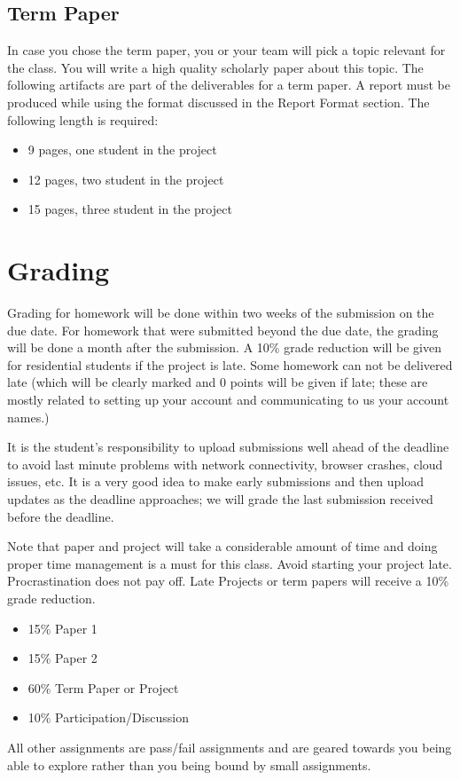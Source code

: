 \subsection{Term Paper}\label{term-paper}

In case you chose the term paper, you or your team will pick a topic
relevant for the class. You will write a high quality scholarly paper
about this topic. The following artifacts are part of the deliverables
for a term paper. A report must be produced while using the format
discussed in the Report Format section. The following length is
required:

\begin{itemize}
\tightlist
\item
  9 pages, one student in the project
\item
  12 pages, two student in the project
\item
  15 pages, three student in the project
\end{itemize}

\section{Grading}\label{grading}

Grading for homework will be done within two weeks of the submission on
the due date. For homework that were submitted beyond the due date, the
grading will be done a month after the submission. A 10\% grade
reduction will be given for residential students if the project is late.
Some homework can not be delivered late (which will be clearly marked
and 0 points will be given if late; these are mostly related to setting
up your account and communicating to us your account names.)

It is the student's responsibility to upload submissions well ahead of
the deadline to avoid last minute problems with network connectivity,
browser crashes, cloud issues, etc. It is a very good idea to make early
submissions and then upload updates as the deadline approaches; we will
grade the last submission received before the deadline.

Note that paper and project will take a considerable amount of time and
doing proper time management is a must for this class. Avoid starting
your project late. Procrastination does not pay off. Late Projects or
term papers will receive a 10\% grade reduction.

\begin{itemize}
\tightlist
\item
  15\% Paper 1
\item
  15\% Paper 2
\item
  60\% Term Paper or Project
\item
  10\% Participation/Discussion
\end{itemize}

All other assignments are pass/fail assignments and are geared towards
you being able to explore rather than you being bound by small
assignments.
